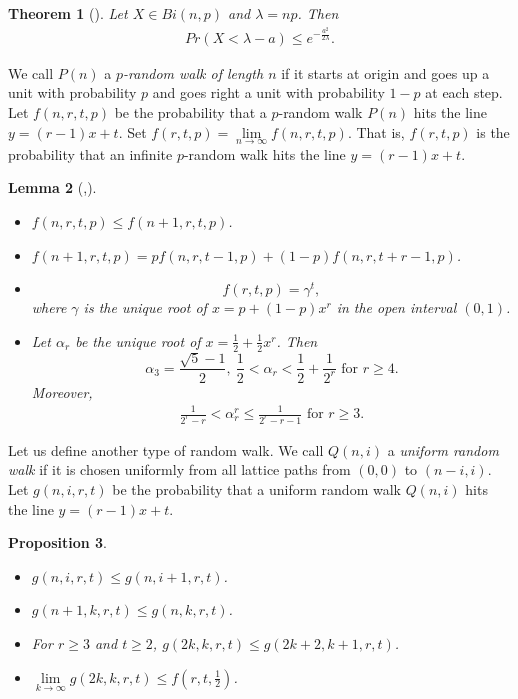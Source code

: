 \documentclass[11pt,a4paper]{article}
\newtheorem{thm}{Theorem}[section]
\newtheorem{prop}[thm]{Proposition}
\newtheorem{lem}[thm]{Lemma}
\newtheorem{false statement}{False statement}
\theoremstyle{definition}
\begin{document}
\begin{thm}[\cite{janson2011random}]
Let $X\in Bi(n,p)$ and $\lambda=np$. Then
\begin{align}\label{chernoff-small}
Pr(X< \lambda-a) \leq e^{-\frac{a^2}{2\lambda}}.
\end{align}
\end{thm}

We call $P(n)$ a {\it $p$-random walk of length $n$} if it starts at origin and goes up a unit with probability $p$ and goes right a unit with probability $1-p$ at each step.  Let $f(n,r,t,p)$ be the probability that a $p$-random walk $P(n)$ hits the line $y=(r-1)x+t$.  Set $f(r,t,p) =\lim\limits_{n\rightarrow \infty} f(n,r,t,p)$. That is, $f(r,t,p)$ is the probability that an infinite $p$-random walk hits the line $y=(r-1)x+t$.



\begin{lem}[\cite{F87},\cite{F91}]\label{lem-key1}
\begin{itemize}
  \item[(i)] $f(n,r,t,p)\leq f(n+1,r,t,p)$.
  \item[(ii)] $f(n+1,r,t,p) = p f(n,r,t-1,p) + (1-p) f(n,r,t+r-1,p)$.
  \item[(iii)]
  \[
      f(r,t,p)=\gamma^t,
  \]
where $\gamma$ is the unique root of  $x = p + (1-p) x^{r}$ in the open interval $(0,1)$.
  \item[(iv)] Let $\alpha_r$ be the unique root of  $x = \frac{1}{2}+ \frac{1}{2}x^{r}$. Then
  \[
      \alpha_3=\frac{\sqrt{5}-1}{2},\ \frac{1}{2}<\alpha_r< \frac{1}{2}+\frac{1}{2^r} \mbox{ for } r\geq 4.
  \]
  Moreover,
  \begin{align}\label{ineq-frankl}
  \frac{1}{2^r-r}<\alpha_r^r\leq \frac{1}{2^r-r-1} \mbox{ for } r\geq 3.
  \end{align}
\end{itemize}
\end{lem}


Let us define another type of random walk. We call $Q(n,i)$ a {\it uniform random walk} if it is chosen uniformly from all lattice paths  from $(0,0)$ to $(n-i,i)$. Let $g(n,i,r,t)$ be  the probability that a uniform random walk $Q(n,i)$ hits the line $y=(r-1)x+t$.

\begin{prop}\label{prop-key}
\begin{itemize}
  \item[(i)] $g(n,i,r,t)\leq g(n,i+1,r,t)$.
  \item[(ii)] $g(n+1,k,r,t)\leq g(n,k,r,t)$.
  \item[(iii)] For $r\geq 3$ and $t\geq 2$, $g(2k,k,r,t)\leq g(2k+2,k+1,r,t)$.
  \item[(iv)] $\lim\limits_{k\rightarrow \infty} g(2k,k,r,t)\leq f(r,t,\frac{1}{2})$.
\end{itemize}
\end{prop}
\end{document}
